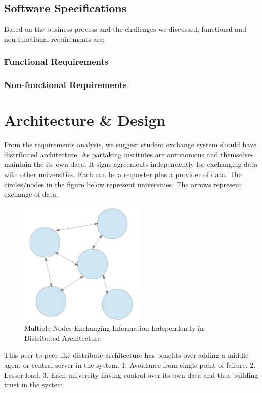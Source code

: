 \documentclass[12pt,a4paper,oneside]{book}
\begin{document}
\section{Software Specifications}
Based on the business process and the challenges we discussed, functional and non-functional requirements are;

    \subsection{Functional Requirements}


    \subsection{Non-functional Requirements}


\chapter{Architecture \& Design}\label{ch-architecture-design}
From the requirements analysis, we suggest student exchange system should have distributed architecture. As partaking institutes are autonomous and themselves maintain the its own data. It signs agreements independently for exchanging data with other universities. Each can be a requester plus a provider of data. The circles/nodes in the figure below represent universities. The arrows represent exchange of data.

\begin{figure}[!htp]
  \centering
  \includegraphics[width=6cm]{architecture_distributed_independent_exchange.png}
  \caption{Multiple Nodes Exchanging Information Independently in Distributed Architecture \cite{The Mobility Project}}
  \label{fig:architecture_distributed_independent_exchange}
\end{figure}

This peer to peer like distribute architecture has benefits over adding a middle agent or central server in the system.
1.	Avoidance from single point of failure.
2.	Lesser load.
3.	Each university having control over its own data and thus building trust in the system.
\end{document}
